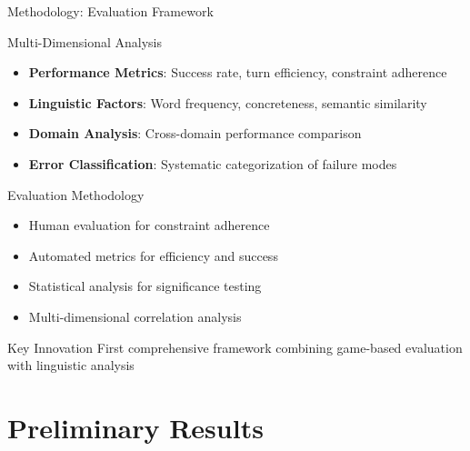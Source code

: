 \documentclass[aspectratio=169]{beamer}
\begin{document}
\begin{frame}{Methodology: Evaluation Framework}
\begin{block}{Multi-Dimensional Analysis}
\begin{itemize}
    \item \textbf{Performance Metrics}: Success rate, turn efficiency, constraint adherence
    \item \textbf{Linguistic Factors}: Word frequency, concreteness, semantic similarity
    \item \textbf{Domain Analysis}: Cross-domain performance comparison
    \item \textbf{Error Classification}: Systematic categorization of failure modes
\end{itemize}
\end{block}

\begin{block}{Evaluation Methodology}
\begin{itemize}
    \item Human evaluation for constraint adherence
    \item Automated metrics for efficiency and success
    \item Statistical analysis for significance testing
    \item Multi-dimensional correlation analysis
\end{itemize}
\end{block}

\begin{alertblock}{Key Innovation}
First comprehensive framework combining game-based evaluation with linguistic analysis
\end{alertblock}
\end{frame}

\section{Preliminary Results}
\end{document}
